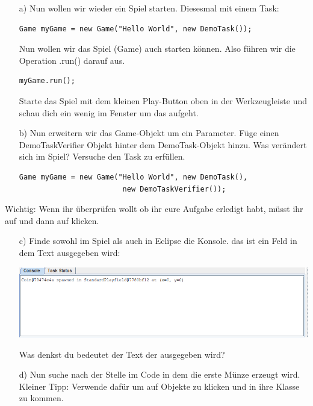 

\begin{enumerate}
    \item[a)] Nun wollen wir wieder ein Spiel starten. Diesesmal mit einem Task:
    
    \begin{lstlisting}
Game myGame = new Game("Hello World", new DemoTask());
    \end{lstlisting}
    
    Nun wollen wir das Spiel (Game) auch starten können. Also führen wir die Operation .run() darauf aus. 
    
    \begin{lstlisting}
myGame.run();
    \end{lstlisting}
    
    Starte das Spiel mit dem kleinen Play-Button oben in der Werkzeugleiste und schau dich ein wenig im Fenster um das aufgeht.
    
    \item[b)] Nun erweitern wir das Game-Objekt um ein Parameter. Füge einen DemoTaskVerifier Objekt hinter dem DemoTask-Objekt hinzu. Was verändert sich im Spiel? Versuche den Task zu erfüllen.
    
    \begin{lstlisting}
Game myGame = new Game("Hello World", new DemoTask(), 
                        new DemoTaskVerifier());
    \end{lstlisting}
    
    \end{enumerate}
    \begin{Infobox}
    Wichtig: Wenn ihr überprüfen wollt ob ihr eure Aufgabe erledigt habt, müsst ihr auf  und dann auf  klicken.
    \end{Infobox}
    \begin{enumerate}
    
    \item[c)] Finde sowohl im Spiel als auch in Eclipse die Konsole. das ist ein Feld in dem Text ausgegeben wird:
    \begin{center}
        \includegraphics[width=\linewidth]{./figures/console.PNG}
    \end{center}
    
    Was denkst du bedeutet der Text der ausgegeben wird?
    
    \item[d)] Nun suche nach der Stelle im Code in dem die erste Münze erzeugt wird. Kleiner Tipp: Verwende dafür  um auf Objekte zu klicken und in ihre Klasse zu kommen.
\end{enumerate}
